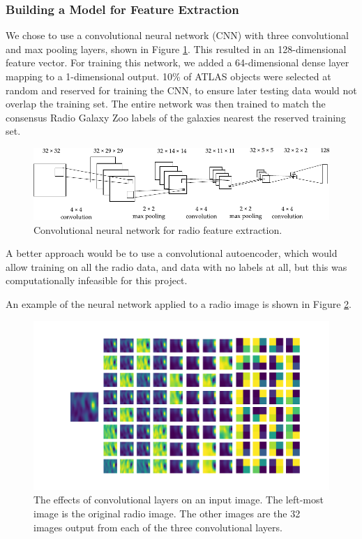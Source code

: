     \subsubsection{Building a Model for Feature Extraction}
    \label{sec:feature-extraction-model}

      We chose to use a convolutional neural network (CNN) with three
      convolutional and max pooling layers, shown in Figure \ref{fig:radio-cnn}.
      This resulted in an 128-dimensional feature vector. For training this
      network, we added a 64-dimensional dense layer mapping to a 1-dimensional
      output. 10\% of ATLAS objects were selected at random and reserved for
      training the CNN, to ensure later testing data would not overlap the
      training set. The entire network was then trained to match the consensus
      Radio Galaxy Zoo labels of the galaxies nearest the reserved training set.

      \begin{figure}[!ht]
         \centering
         \includegraphics[width=\textwidth]{images/cnn_new.pdf}
         \caption{Convolutional neural network for radio feature extraction.}
         \label{fig:radio-cnn}
       \end{figure}

      A better approach would be to use a convolutional autoencoder, which would
      allow training on all the radio data, and data with no labels at all, but
      this was computationally infeasible for this project.

      An example of the neural network applied to a radio image is shown in
      Figure \ref{fig:rgz-cnn}.

      \begin{figure}[!ht]
        \centering
        \includegraphics[width=\textwidth]{images/rgz_cnn}
        \caption{The effects of convolutional layers on an input image. The
          left-most image is the original radio image. The other images are the
          32 images output from each of the three convolutional layers.}
        \label{fig:rgz-cnn}
      \end{figure}

